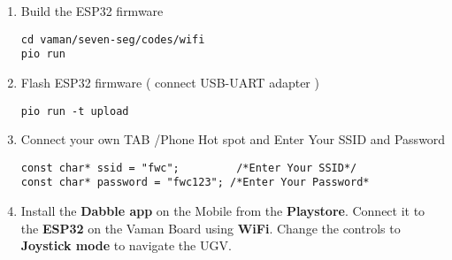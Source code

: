\begin{enumerate}[label=\thesection.\arabic*.,ref=\thesection.\theenumi]
\item Build the ESP32 firmware
\begin{lstlisting}
cd vaman/seven-seg/codes/wifi
pio run
\end{lstlisting} 

\item Flash ESP32 firmware ( connect USB-UART adapter )
\begin{lstlisting}
pio run -t upload
\end{lstlisting} 

\item Connect your own TAB /Phone Hot spot and  Enter Your SSID and  Password
\begin{lstlisting}
const char* ssid = "fwc";         /*Enter Your SSID*/ 
const char* password = "fwc123"; /*Enter Your Password*
\end{lstlisting} 
\item Install the \textbf{Dabble app} on the Mobile from the \textbf{Playstore}. Connect it to the \textbf{ESP32} on the Vaman Board using \textbf{WiFi}. Change the controls to \textbf{Joystick mode} to navigate the UGV.\\


\end{enumerate}
